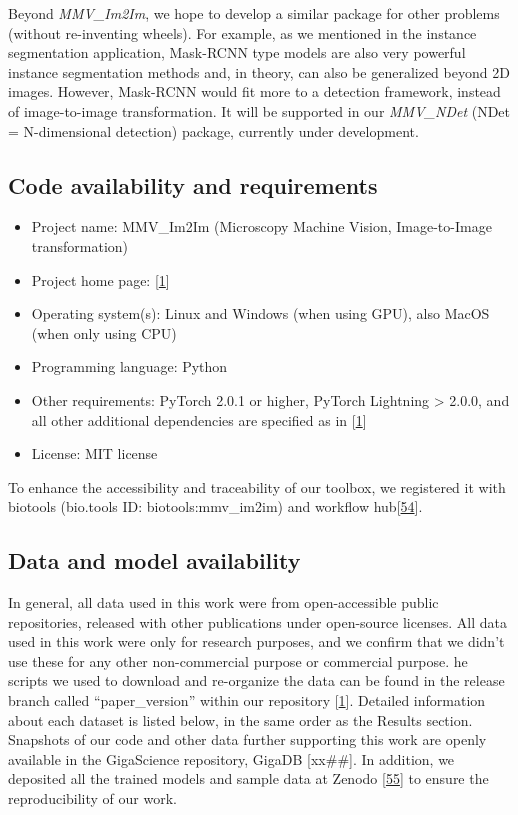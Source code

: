 Beyond \emph{MMV\_Im2Im}, we hope to develop a similar package for other problems (without re-inventing wheels). For example, as we mentioned in the instance segmentation application, Mask-RCNN type models are also very powerful instance segmentation methods and, in theory, can also be generalized beyond 2D images. However, Mask-RCNN would fit more to a detection framework, instead of image-to-image transformation. It will be supported in our \emph{MMV\_NDet} (NDet = N-dimensional detection) package, currently under development.

\hypertarget{code-availability-and-requirements}{%
\subsection{Code availability and requirements}\label{code-availability-and-requirements}}

\begin{itemize}
\item
  Project name: MMV\_Im2Im (Microscopy Machine Vision, Image-to-Image transformation)
\item
  Project home page: {[}\protect\hyperlink{ref-10dtMviwb}{1}{]}
\item
  Operating system(s): Linux and Windows (when using GPU), also MacOS (when only using CPU)
\item
  Programming language: Python
\item
  Other requirements: PyTorch 2.0.1 or higher, PyTorch Lightning \textgreater{} 2.0.0, and all other additional dependencies are specified as in {[}\protect\hyperlink{ref-10dtMviwb}{1}{]}
\item
  License: MIT license
\end{itemize}

To enhance the accessibility and traceability of our toolbox, we registered it with biotools (bio.tools ID: biotools:mmv\_im2im) and workflow hub{[}\protect\hyperlink{ref-xl7YzUeX}{54}{]}.

\hypertarget{data-and-model-availability}{%
\subsection{Data and model availability}\label{data-and-model-availability}}

In general, all data used in this work were from open-accessible public repositories, released with other publications under open-source licenses. All data used in this work were only for research purposes, and we confirm that we didn't use these for any other non-commercial purpose or commercial purpose. he scripts we used to download and re-organize the data can be found in the release branch called ``paper\_version'' within our repository {[}\protect\hyperlink{ref-10dtMviwb}{1}{]}. Detailed information about each dataset is listed below, in the same order as the Results section. Snapshots of our code and other data further supporting this work are openly available in the GigaScience repository, GigaDB {[}xx\#\#{]}. In addition, we deposited all the trained models and sample data at Zenodo {[}\protect\hyperlink{ref-FBoj3fXM}{55}{]} to ensure the reproducibility of our work.

